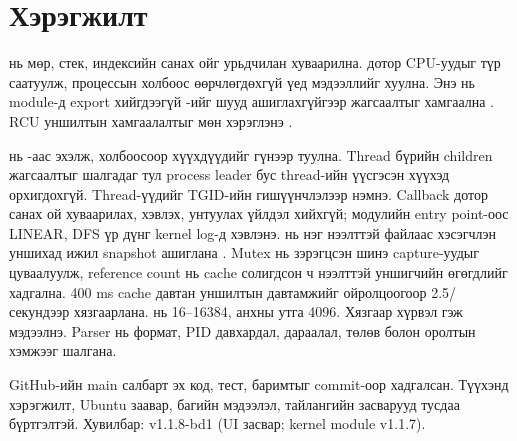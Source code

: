 \section{Хэрэгжилт}
 нь мөр, стек, индексийн санах ойг урьдчилан хуваарилна.  дотор CPU-уудыг түр саатуулж, процессын холбоос өөрчлөгдөхгүй үед мэдээллийг хуулна. Энэ нь module-д export хийгдээгүй -ийг шууд ашиглахгүйгээр жагсаалтыг хамгаална \cite{stop}. RCU уншилтын хамгаалалтыг мөн хэрэглэнэ \cite{rcu}.\par
{} нь -аас эхэлж,  холбоосоор хүүхдүүдийг гүнээр туулна. Thread бүрийн children жагсаалтыг шалгадаг тул process leader бус thread-ийн үүсгэсэн хүүхэд орхигдохгүй. Thread-үүдийг TGID-ийн гишүүнчлэлээр нэмнэ. Callback дотор санах ой хуваарилах, хэвлэх, унтуулах үйлдэл хийхгүй; модулийн entry point-оос LINEAR, DFS үр дүнг kernel log-д хэвлэнэ.
 нь нэг нээлттэй файлаас хэсэгчлэн уншихад ижил snapshot ашиглана \cite{seq}. Mutex нь зэрэгцсэн шинэ capture-уудыг цуваалуулж, reference count нь cache солигдсон ч нээлттэй уншигчийн өгөгдлийг хадгална. 400 ms cache давтан уншилтын  давтамжийг ойролцоогоор 2.5/секундээр хязгаарлана.  нь 16--16384, анхны утга 4096. Хязгаар хүрвэл  гэж мэдээлнэ. Parser нь формат, PID давхардал, дараалал, төлөв болон оролтын хэмжээг шалгана.

GitHub-ийн main салбарт эх код, тест, баримтыг commit-оор хадгалсан. Түүхэнд хэрэгжилт, Ubuntu заавар, багийн мэдээлэл, тайлангийн засварууд тусдаа бүртгэлтэй. Хувилбар: v1.1.8-bd1 (UI засвар; kernel module v1.1.7).\par

